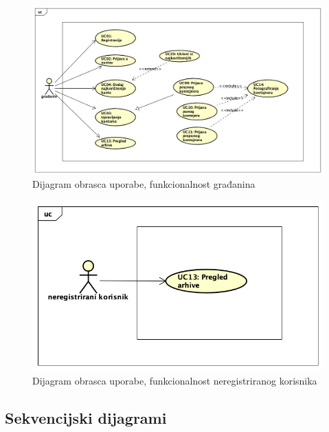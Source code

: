 				
			
				\begin{figure}[H]
					\includegraphics[scale=0.5]{figures/UC_za_gradana.PNG}
					\centering
					\caption{Dijagram obrasca uporabe, funkcionalnost građanina}
					\label{fig:ucgr-diag}
				\end{figure}
			
				

				\begin{figure}[H]
					\includegraphics[scale=0.5]{figures/UC_za_neregistriranog korisnika.PNG}
					\centering
					\caption{Dijagram obrasca uporabe, funkcionalnost neregistriranog korisnika}
					\label{fig:ucgr-diag}
				\end{figure}
			
					
					
					
					
						\eject		
				
			\subsection{Sekvencijski dijagrami}
				
